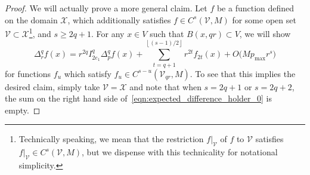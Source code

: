 \documentclass{article}
\newcommand{\restr}[2]{\ensuremath{\left.#1\right|_{#2}}}
\newcommand{\floor}[1]{\left\lfloor #1 \right\rfloor}
\newcommand{\1}{\mathbf{1}}
\newcommand{\Xset}{\mathcal{X}}
\newcommand{\Vset}{\mathcal{V}}
\theoremstyle{alden}
\theoremstyle{aldenthm}
\theoremstyle{definition}
\theoremstyle{remark}
\begin{document}
\begin{proof}
	We will actually prove a more general claim. Let $f$ be a function defined on the domain $\Xset$, which additionally satisfies $f \in C^s(\Vset,M)$ for some open set $\Vset \subset \Xset$\footnote{Technically speaking, we mean that the restriction $\restr{f}{\Vset}$ of $f$ to $\Vset$ satisfies $\restr{f}{\Vset} \in C^s(\Vset,M)$, but we dispense with this technicality for notational simplicity.}, and $s \geq 2q + 1$. For any $x \in V$ such that $B(x,qr) \subset V$, we will show
	\begin{equation}
	\label{eqn:expected_difference_holder_0}
	\Delta_r^qf(x) = r^{2q} I_{2e_1}^q \Delta_p^qf(x) + \sum_{t = q + 1}^{\floor{(s - 1)/2}}r^{2t} f_{2t}(x) + O\bigl(M p_{\max}r^s\bigr)
	\end{equation} 
	for functions $f_u$ which satisfy $f_u \in C^{s - u}(\Vset_{qr},M)$. To see that this implies the desired claim, simply take $\Vset = \Xset$ and note that when $s = 2q + 1$ or $s = 2q + 2$, the sum on the right hand side of~\eqref{eqn:expected_difference_holder_0} is empty. 
	

\end{proof}
\end{document}
